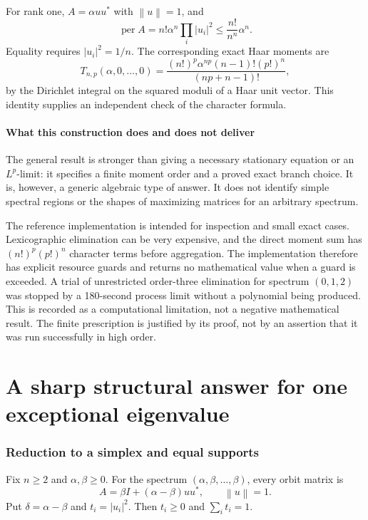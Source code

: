 \documentclass[11pt]{article}
\newcommand{\per}{\operatorname{per}}
\newcommand{\norm}[1]{\left\lVert#1\right\rVert}
\theoremstyle{definition}\newtheorem{definition}[theorem]{Definition}
\theoremstyle{remark}\newtheorem{remark}[theorem]{Remark}
\begin{document}
For rank one, $A=\alpha uu^*$ with $\norm u=1$, and
\[
 \per A=n!\alpha^n\prod_i|u_i|^2
 \leq\frac{n!}{n^n}\alpha^n.
\]
Equality requires $|u_i|^2=1/n$. The corresponding exact Haar moments are
\begin{equation}\label{eq:rankone-moment}
 T_{n,p}(\alpha,0,\ldots,0)
 =\frac{(n!)^p\alpha^{np}(n-1)!(p!)^n}{(np+n-1)!},
\end{equation}
by the Dirichlet integral on the squared moduli of a Haar unit vector. This identity supplies an independent check of the character formula.

\subsection{What this construction does and does not deliver}
The general result is stronger than giving a necessary stationary equation or an $L^p$-limit: it specifies a finite moment order and a proved exact branch choice. It is, however, a generic algebraic type of answer. It does not identify simple spectral regions or the shapes of maximizing matrices for an arbitrary spectrum.

The reference implementation is intended for inspection and small exact cases. Lexicographic elimination can be very expensive, and the direct moment sum has $(n!)^p(p!)^n$ character terms before aggregation. The implementation therefore has explicit resource guards and returns no mathematical value when a guard is exceeded. A trial of unrestricted order-three elimination for spectrum $(0,1,2)$ was stopped by a 180-second process limit without a polynomial being produced. This is recorded as a computational limitation, not a negative mathematical result. The finite prescription is justified by its proof, not by an assertion that it was run successfully in high order.

\part{A sharp structural answer for one exceptional eigenvalue}

\section{Reduction to a simplex and equal supports}\label{sec:family}
Fix $n\geq2$ and $\alpha,\beta\geq0$. For the spectrum $(\alpha,\beta,\ldots,\beta)$, every orbit matrix is
\[
 A=\beta I+(\alpha-\beta)uu^*,\qquad\norm u=1.
\]
Put $\delta=\alpha-\beta$ and $t_i=|u_i|^2$. Then $t_i\geq0$ and $\sum_i t_i=1$.
\end{document}
